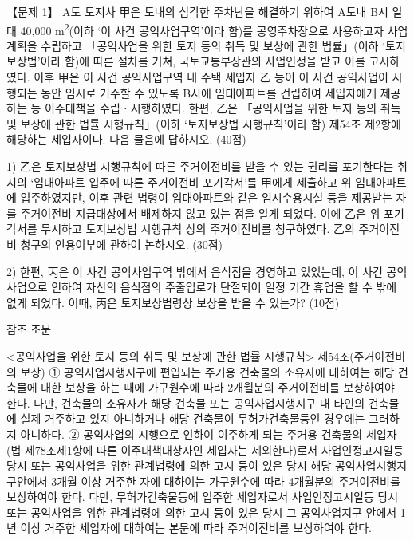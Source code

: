\begin{longquestion}{【문제 1】}
A도 도지사 甲은 도내의 심각한 주차난을 해결하기 위하여 A도내 B시 일대 40,000 m\textsuperscript{2}(이하 ‘이 사건 공익사업구역’이라 함)를 공영주차장으로 사용하고자 사업계획을 수립하고 「공익사업을 위한 토지 등의 취득 및 보상에 관한 법률」(이하 ‘토지보상법’이라 함)에 따른 절차를 거쳐, 국토교통부장관의 사업인정을 받고 이를 고시하였다. 이후 甲은 이 사건 공익사업구역 내 주택 세입자 乙 등이 이 사건 공익사업이 시행되는 동안 임시로 거주할 수 있도록 B시에 임대아파트를 건립하여 세입자에게 제공하는 등 이주대책을 수립ㆍ시행하였다. 한편, 乙은 「공익사업을 위한 토지 등의 취득 및 보상에 관한 법률 시행규칙」(이하 ‘토지보상법 시행규칙’이라 함) 제54조 제2항에 해당하는 세입자이다. 다음 물음에 답하시오. (40점) \par
1) 乙은 토지보상법 시행규칙에 따른 주거이전비를 받을 수 있는 권리를 포기한다는 취지의 ‘임대아파트 입주에 따른 주거이전비 포기각서’를 甲에게 제출하고 위 임대아파트에 입주하였지만, 이후 관련 법령이 임대아파트와 같은 임시수용시설 등을 제공받는 자를 주거이전비 지급대상에서 배제하지 않고 있는 점을 알게 되었다. 이에 乙은 위 포기각서를 무시하고 토지보상법 시행규칙 상의 주거이전비를 청구하였다. 乙의 주거이전비 청구의 인용여부에 관하여 논하시오. (30점) \par
2) 한편, 丙은 이 사건 공익사업구역 밖에서 음식점을 경영하고 있었는데, 이 사건 공익사업으로 인하여 자신의 음식점의 주출입로가 단절되어 일정 기간 휴업을 할 수 밖에 없게 되었다. 이때, 丙은 토지보상법령상 보상을 받을 수 있는가? (10점) \par
\begin{framedtext}
참조 조문 \par
<공익사업을 위한 토지 등의 취득 및 보상에 관한 법률 시행규칙> 
제54조(주거이전비의 보상) ① 공익사업시행지구에 편입되는 주거용 건축물의 소유자에 대하여는 해당 건축물에 대한 보상을 하는 때에 가구원수에 따라 2개월분의 주거이전비를 보상하여야 한다. 다만, 건축물의 소유자가 해당 건축물 또는 공익사업시행지구 내 타인의 건축물에 실제 거주하고 있지 아니하거나 해당 건축물이 무허가건축물등인 경우에는 그러하지 아니하다. 
② 공익사업의 시행으로 인하여 이주하게 되는 주거용 건축물의 세입자(법 
제78조제1항에 따른 이주대책대상자인 세입자는 제외한다)로서 사업인정고시일등 당시 또는 공익사업을 위한 관계법령에 의한 고시 등이 있은 당시 해당 공익사업시행지구안에서 3개월 이상 거주한 자에 대하여는 가구원수에 따라 4개월분의 주거이전비를 보상하여야 한다. 다만, 무허가건축물등에 입주한 세입자로서 사업인정고시일등 당시 또는 공익사업을 위한 관계법령에 의한 고시 등이 있은 당시 그 공익사업지구 안에서 1년 이상 거주한 세입자에 대하여는 본문에 따라 주거이전비를 보상하여야 한다.
\end{framedtext}

\end{longquestion}
